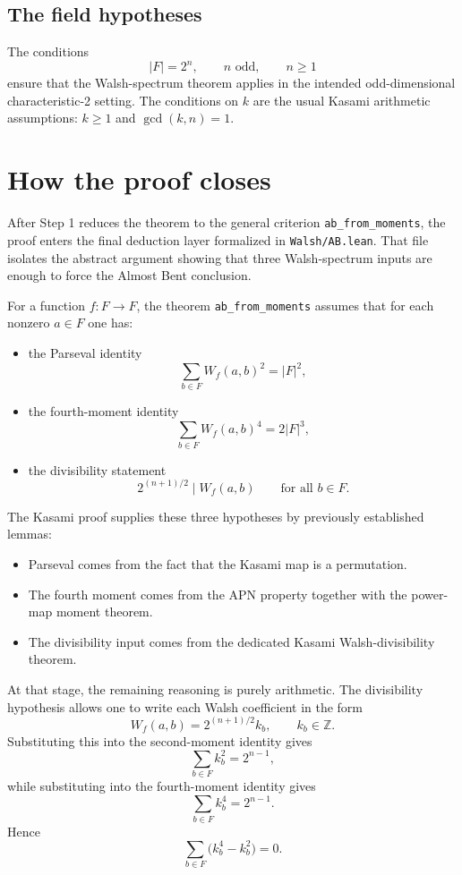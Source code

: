 \documentclass[11pt]{article}
\begin{document}
\subsection{The field hypotheses}
The conditions
\[
  |F| = 2^n, \qquad n \text{ odd}, \qquad n \ge 1
\]
ensure that the Walsh-spectrum theorem applies in the intended odd-dimensional characteristic-2 setting. The conditions on $k$ are the usual Kasami arithmetic assumptions: $k \ge 1$ and $\gcd(k,n)=1$.

\section{How the proof closes}
After Step 1 reduces the theorem to the general criterion \texttt{ab\_from\_moments}, the proof enters the final deduction layer formalized in \texttt{Walsh/AB.lean}. That file isolates the abstract argument showing that three Walsh-spectrum inputs are enough to force the Almost Bent conclusion.

For a function $f : F \to F$, the theorem \texttt{ab\_from\_moments} assumes that for each nonzero $a \in F$ one has:
\begin{itemize}
  \item the Parseval identity
  \[
    \sum_{b \in F} W_f(a,b)^2 = |F|^2,
  \]
  \item the fourth-moment identity
  \[
    \sum_{b \in F} W_f(a,b)^4 = 2|F|^3,
  \]
  \item the divisibility statement
  \[
    2^{(n+1)/2} \mid W_f(a,b)
    \qquad \text{for all } b \in F.
  \]
\end{itemize}

The Kasami proof supplies these three hypotheses by previously established lemmas:
\begin{itemize}
  \item Parseval comes from the fact that the Kasami map is a permutation.
  \item The fourth moment comes from the APN property together with the power-map moment theorem.
  \item The divisibility input comes from the dedicated Kasami Walsh-divisibility theorem.
\end{itemize}

At that stage, the remaining reasoning is purely arithmetic. The divisibility hypothesis allows one to write each Walsh coefficient in the form
\[
  W_f(a,b) = 2^{(n+1)/2} k_b,
  \qquad k_b \in \mathbb{Z}.
\]
Substituting this into the second-moment identity gives
\[
  \sum_{b \in F} k_b^2 = 2^{n-1},
\]
while substituting into the fourth-moment identity gives
\[
  \sum_{b \in F} k_b^4 = 2^{n-1}.
\]
Hence
\[
  \sum_{b \in F} \bigl(k_b^4 - k_b^2\bigr) = 0.
\]
\end{document}
